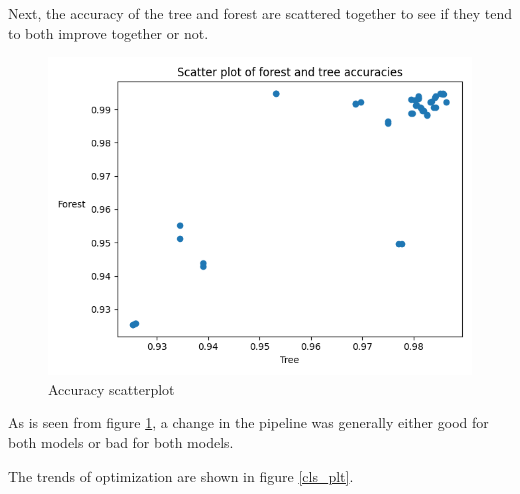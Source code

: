 \documentclass[12pt, letterpaper]{article}
\begin{document}
Next, the accuracy of the tree and forest are scattered together to see if they tend to both improve together or not.

\begin{figure}[H]
    \centering
    \includegraphics[scale=0.7]{accuracy_scatterplot.png}
    \caption{Accuracy scatterplot}
    \label{acc_plt} %
\end{figure}

As is seen from figure \ref{acc_plt}, a change in the pipeline was generally either good for both models or bad for both models.

The trends of optimization are shown in figure \ref{cls_plt}.
\end{document}
